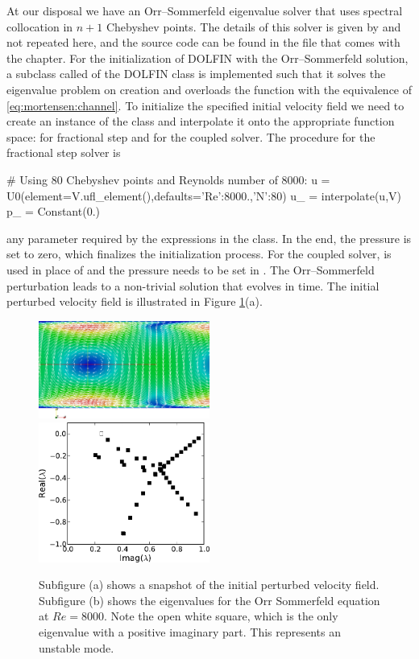 At our disposal we have an Orr--Sommerfeld eigenvalue solver that uses
spectral collocation in $n+1$ Chebyshev points. The details of this
solver is given by \citet{Trefethen2006} and not repeated here, and the
source code can be found in the file  that
comes with the chapter. For the initialization of DOLFIN 
with the Orr--Sommerfeld solution, a subclass called  of the
DOLFIN class  is implemented such that it solves the
eigenvalue problem on creation and overloads the  function
with the equivalence of \eqref{eq:mortensen:channel}. To initialize the
specified initial velocity field we need to create an instance of the
 class and interpolate it onto the appropriate function space:
 for fractional step and  for the coupled solver. The
procedure for the fractional step solver is
\begin{python}
# Using 80 Chebyshev points and Reynolds number of 8000:
u = U0(element=V.ufl_element(),defaults={'Re':8000.,'N':80})
u_ = interpolate(u,V)
p_ = Constant(0.)
\end{python}
any parameter required by the expressions in the  class. In the
end, the pressure is set to zero, which finalizes the initialization
process. For the coupled solver,  is used in place of 
and the pressure needs to be set in . The Orr--Sommerfeld
perturbation leads to a non-trivial solution that evolves in
time. The initial perturbed velocity field is illustrated in Figure
\ref{fig:mortensen:OS_init}(a).
\begin{figure}
\includegraphics[width=0.5\textwidth]{chapters/mortensen/pdf/OS_init.pdf}
\includegraphics[width=0.5\textwidth]{chapters/mortensen/pdf/OrrS_eigvals.pdf}
\caption{Subfigure (a) shows a snapshot of the initial perturbed velocity
field. Subfigure (b) shows the eigenvalues for the Orr Sommerfeld equation
at $Re=8000$. Note the open white square, which is the only eigenvalue
with a positive imaginary part. This represents an unstable mode.}
 \label{fig:mortensen:OS_init}
\end{figure}

